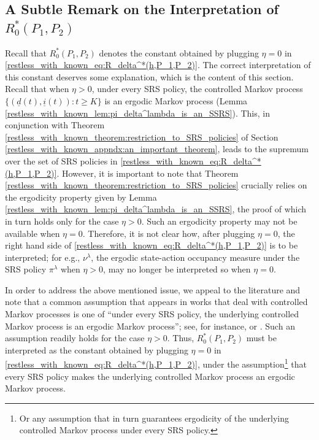 %

{\color{black} \subsection{A Subtle Remark on the Interpretation of $R_0^*(P_1, P_2)$}
Recall that $R_0^*(P_1,P_2)$ denotes the constant obtained by plugging $\eta=0$ in \eqref{restless_with_known_eq:R_delta^*(h,P_1,P_2)}. The correct interpretation of this constant deserves some explanation, which is the content of this section. Recall that when $\eta>0$, under every SRS policy, the controlled Markov process $\{(\underline{d}(t), \underline{i}(t)): t\geq K\}$ is an ergodic Markov process (Lemma \ref{restless_with_known_lem:pi_delta^lambda_is_an_SSRS}). This, in conjunction with Theorem  \ref{restless_with_known_theorem:restriction_to_SRS_policies} of Section \ref{restless_with_known_appndx:an_important_theorem}, leads to the supremum over the set of SRS policies in \eqref{restless_with_known_eq:R_delta^*(h,P_1,P_2)}. However, it is important to note that Theorem  \ref{restless_with_known_theorem:restriction_to_SRS_policies} crucially relies on the ergodicity property given by Lemma \ref{restless_with_known_lem:pi_delta^lambda_is_an_SSRS}, the proof of which in turn holds only for the case $\eta>0$. Such an ergodicity property may not be available when $\eta=0$. Therefore, it is not clear how, after plugging $\eta=0$, the right hand side of \eqref{restless_with_known_eq:R_delta^*(h,P_1,P_2)} is to be interpreted; for e.g., $\nu^\lambda$, the ergodic state-action occupancy measure under the SRS policy $\pi^\lambda$ when $\eta>0$, may no longer be interpreted so when $\eta=0$.
	
	In order to address the above mentioned issue, we appeal to the literature and note that a common assumption that appears in works that deal with controlled Markov processes is one of ``under every SRS policy, the underlying controlled Markov process is an ergodic Markov process''; see, for instance, \cite[pp. 58, Section II]{borkar1988control} or \cite{puterman2014markov}. Such an assumption readily holds for the case $\eta>0$. Thus,  $R_0^*(P_1,P_2)$ must be interpreted as the constant obtained by plugging $\eta=0$ in \eqref{restless_with_known_eq:R_delta^*(h,P_1,P_2)}, under the assumption\footnote{Or any assumption that in turn guarantees ergodicity of the underlying controlled Markov process under every SRS policy.} that every SRS policy makes the underlying controlled Markov process an ergodic Markov process.}

